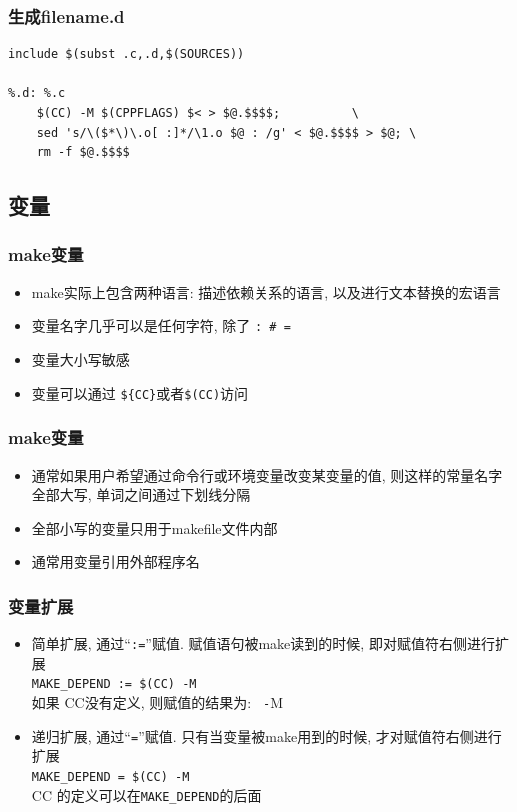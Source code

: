 \documentclass[compress]{beamer}
\begin{document}
\begin{frame}[containsverbatim]
\frametitle{生成filename.d}
\begin{Verbatim}[showtabs=true]
include $(subst .c,.d,$(SOURCES))

%.d: %.c
	$(CC) -M $(CPPFLAGS) $< > $@.$$$$;          \
	sed 's/\($*\)\.o[ :]*/\1.o $@ : /g' < $@.$$$$ > $@; \
	rm -f $@.$$$$
\end{Verbatim}

\end{frame}

\subsection{变量}

\begin{frame}[containsverbatim]
\frametitle{make变量}

\begin{itemize}
\item make实际上包含两种语言: 描述依赖关系的语言, 以及进行文本替换的宏语言
\item 变量名字几乎可以是任何字符, 除了 \verb~: # =~
\item 变量大小写敏感
\item 变量可以通过 \verb~${CC}~或者\verb~$(CC)~访问
\end{itemize}
\end{frame}

\begin{frame}
\frametitle{make变量}

\begin{itemize}
\item 通常如果用户希望通过命令行或环境变量改变某变量的值, 则这样的常量名字全部大写, 单词之间通过下划线分隔
\item 全部小写的变量只用于makefile文件内部
\item 通常用变量引用外部程序名
\end{itemize}
\end{frame}

\begin{frame}[containsverbatim]
\frametitle{变量扩展}
\begin{itemize}
\item 简单扩展, 通过``\verb~:=~''赋值. 赋值语句被make读到的时候, 即对赋值符右侧进行扩展\\
\verb~MAKE_DEPEND := $(CC) -M~ \\
如果 CC没有定义, 则赋值的结果为: \verb*~ -~M
\item 递归扩展, 通过``\verb~=~''赋值. 只有当变量被make用到的时候, 才对赋值符右侧进行扩展\\
\verb~MAKE_DEPEND = $(CC) -M~ \\
CC 的定义可以在\verb~MAKE_DEPEND~的后面
\end{itemize}

\end{frame}
\end{document}
